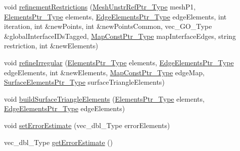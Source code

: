 \begin{DoxyCompactItemize}
\item 
void \hyperlink{classFEDD_1_1RefinementFactory_a7099db47add1a0f9e431fc960860db2d}{refinement\+Restrictions} (\hyperlink{classFEDD_1_1RefinementFactory_aea0fab96821387bc772333299102b2c9}{Mesh\+Unstr\+Ref\+Ptr\+\_\+\+Type} mesh\+P1, \hyperlink{classFEDD_1_1RefinementFactory_a0994b5b7b6d080048673941251999f2e}{Elements\+Ptr\+\_\+\+Type} elements, \hyperlink{classFEDD_1_1RefinementFactory_ae5285e990ec4632d6188a1280627ad13}{Edge\+Elements\+Ptr\+\_\+\+Type} edge\+Elements, int iteration, int \&new\+Points, int \&new\+Points\+Common, vec\+\_\+\+G\+O\+\_\+\+Type \&global\+Interface\+I\+Ds\+Tagged, \hyperlink{classFEDD_1_1RefinementFactory_a8256ccdf1b2a5c977ddc011f4e8eb8d3}{Map\+Const\+Ptr\+\_\+\+Type} map\+Interface\+Edges, string restriction, int \&new\+Elements)
\item 
void \hyperlink{classFEDD_1_1RefinementFactory_ae4401ece866b918923322d46d0c5e33e}{refine\+Irregular} (\hyperlink{classFEDD_1_1RefinementFactory_a0994b5b7b6d080048673941251999f2e}{Elements\+Ptr\+\_\+\+Type} elements, \hyperlink{classFEDD_1_1RefinementFactory_ae5285e990ec4632d6188a1280627ad13}{Edge\+Elements\+Ptr\+\_\+\+Type} edge\+Elements, int \&new\+Elements, \hyperlink{classFEDD_1_1RefinementFactory_a8256ccdf1b2a5c977ddc011f4e8eb8d3}{Map\+Const\+Ptr\+\_\+\+Type} edge\+Map, \hyperlink{classFEDD_1_1RefinementFactory_a1067ba23325b19eae16a864f25f7d68f}{Surface\+Elements\+Ptr\+\_\+\+Type} surface\+Triangle\+Elements)
\item 
void \hyperlink{classFEDD_1_1RefinementFactory_acc422779a3cf6ca5a4c916acf7708418}{build\+Surface\+Triangle\+Elements} (\hyperlink{classFEDD_1_1RefinementFactory_a0994b5b7b6d080048673941251999f2e}{Elements\+Ptr\+\_\+\+Type} elements, \hyperlink{classFEDD_1_1RefinementFactory_ae5285e990ec4632d6188a1280627ad13}{Edge\+Elements\+Ptr\+\_\+\+Type} edge\+Elements)
\item 
void \hyperlink{classFEDD_1_1RefinementFactory_a4532ed5c403d767f316e922a3d769853}{set\+Error\+Estimate} (vec\+\_\+dbl\+\_\+\+Type error\+Elements)
\item 
vec\+\_\+dbl\+\_\+\+Type \hyperlink{classFEDD_1_1RefinementFactory_aecc0c9142abed8227daa43fc5db6ae1c}{get\+Error\+Estimate} ()
\end{DoxyCompactItemize}
